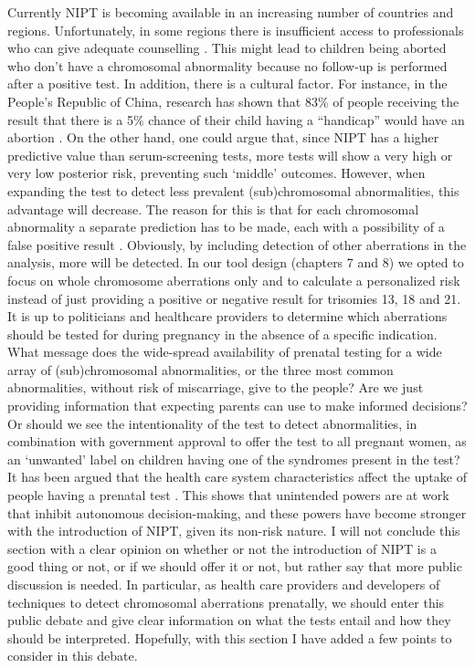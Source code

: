 Currently NIPT is becoming available in an increasing number of countries and regions. 
Unfortunately, in some regions there is insufficient access to professionals who can give adequate counselling \cite{Allyse_2015}. 
This might lead to children being aborted who don’t have a chromosomal abnormality because no follow-up is performed after a positive test. 
In addition, there is a cultural factor. For instance, in the People’s Republic of China, research has shown that 83\% of people receiving the result that there is a 5\% chance of their child having a “handicap” would have an abortion \cite{Allyse_2015}. 
On the other hand, one could argue that, since NIPT has a higher predictive value than serum-screening tests, more tests will show a very high or very low posterior risk, preventing such ‘middle’ outcomes. 
However, when expanding the test to detect less prevalent (sub)chromosomal abnormalities, this advantage will decrease. The reason for this is that for each chromosomal abnormality a separate prediction has to be made, each with a possibility of a false positive result \cite{Chitty_2018}. 
Obviously, by including detection of other aberrations in the analysis, more will be detected.
In our tool design (chapters 7 and 8) we opted to focus on whole chromosome aberrations only and to calculate a personalized risk instead of just providing a positive or negative result for trisomies 13, 18 and 21. 
It is up to politicians and healthcare providers to determine which aberrations should be tested for during pregnancy in the absence of a specific indication. 
What message does the wide-spread availability of prenatal testing for a wide array of (sub)chromosomal abnormalities, or the three most common abnormalities, without risk of miscarriage, give to the people? 
Are we just providing information that expecting parents can use to make informed decisions? 
Or should we see the intentionality of the test to detect abnormalities, in combination with government approval to offer the test to all pregnant women, as an ‘unwanted’ label on children having one of the syndromes present in the test? 
It has been argued that the health care system characteristics affect the uptake of people having a prenatal test \cite{Crombag_2016}. 
This shows that unintended powers are at work that inhibit autonomous decision-making, and these powers have become stronger with the introduction of NIPT, given its non-risk nature. 
I will not conclude this section with a clear opinion on whether or not the introduction of NIPT is a good thing or not, or if we should offer it or not, but rather say that more public discussion is needed. 
In particular, as health care providers and developers of techniques to detect chromosomal aberrations prenatally, we should enter this public debate and give clear information on what the tests entail and how they should be interpreted. 
Hopefully, with this section I have added a few points to consider in this debate. 

